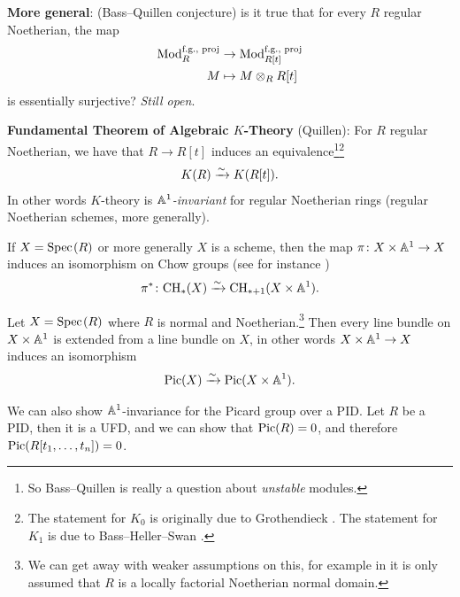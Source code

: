 \documentclass[11pt,openany]{book}
\begin{document}
\textbf{More general}: (Bass--Quillen conjecture) is it true that for every $R$ regular Noetherian, the map
\begin{align*}
    \mathrm{Mod}_R^{\text{f.g., proj}} &\to \mathrm{Mod}_{R[t]}^{\text{f.g., proj}} \\
    M &\mapsto M \otimes_R R[t]
\end{align*}
is essentially surjective? \textit{Still open}.

\textbf{Fundamental Theorem of Algebraic $K$-Theory} (Quillen): For $R$ regular Noetherian, we have that $R \to R[t]$ induces an equivalence\footnote{%
So Bass--Quillen is really a question about \textit{unstable} modules.}\footnote{%
The statement for $K_0$ is originally due to Grothendieck \cite[5.6.1.3]{Aravind}. The statement for $K_1$ is due to Bass--Heller--Swan \cite[5.8.2.1]{Aravind}.
}
\begin{align*}
    K(R) \xrightarrow{\sim} K(R[t]).
\end{align*}
%
In other words $K$-theory is \textit{$\mathbb{A}^1$-invariant} for regular Noetherian rings (regular Noetherian schemes, more generally).

\begin{example} If $X = \text{Spec}\hspace{0.1em}(R)$ or more generally $X$ is a scheme, then the map $\pi \colon X \times \mathbb{A}^1 \to X$ induces an isomorphism on Chow groups (see for instance \cite[3.3]{Fulton})
\begin{align*}
    \pi^\ast \colon \mathrm{CH}_\ast(X) \xrightarrow{\sim} \mathrm{CH}_{\ast+1}(X \times \mathbb{A}^1).
\end{align*}
\end{example}

\begin{example} Let $X = \text{Spec}\hspace{0.1em}(R)$ where $R$ is normal and Noetherian.\footnote{%
We can get away with weaker assumptions on this, for example in \cite[3.7.13]{Aravind} it is only assumed that $R$ is a locally factorial Noetherian normal domain.
}
Then every line bundle on $X \times \mathbb{A}^1$ is extended from a line bundle on $X$, in other words $X \times \mathbb{A}^1 \to X$ induces an isomorphism
\begin{align*}
    \mathrm{Pic}(X) \xrightarrow{\sim} \mathrm{Pic}(X \times\mathbb{A}^1).
\end{align*}
\end{example}

\begin{example} We can also show $\mathbb{A}^1$-invariance for the Picard group over a PID. Let $R$ be a PID, then it is a UFD, and we can show that $\mathrm{Pic}(R) = 0$, and therefore $\mathrm{Pic}(R[t_1, \ldots, t_n])=0$.
\end{example}
\end{document}
